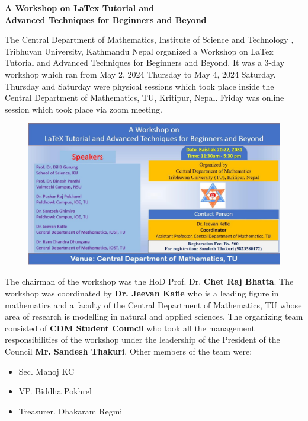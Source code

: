 \documentclass[a4paper,12pt]{report}
\begin{document}
\begin{center}
  \bfseries \Large A Workshop on LaTex Tutorial and\\
  Advanced Techniques for Beginners and Beyond

\end{center}
\vspace{5mm}
The Central Department of Mathematics, Institute of Science and Technology , Tribhuvan University, Kathmandu Nepal organized a Workshop on LaTex Tutorial and Advanced Techniques for Beginners and Beyond. It was a 3-day workshop which ran from May 2, 2024 Thursday to May 4, 2024 Saturday. Thursday and Saturday were physical sessions which took place inside the Central Department of Mathematics, TU, Kritipur, Nepal. Friday was online session which took place via zoom meeting.
\vspace{5mm}

\begin{figure}[h!]
  \centering
  \includegraphics[scale=0.33]{flyer.jpg}
\end{figure}
\vspace{5mm}

\noindent
The chairman of the workshop was the HoD Prof. Dr. \textbf{Chet Raj Bhatta}. The workshop was coordinated by \textbf{Dr. Jeevan Kafle} who is a leading figure in mathematics and a faculty of the Central Department of Mathematics, TU whose area of research is modelling in natural and applied sciences. The organizing team consisted of \textbf{CDM Student Council} who took all the management responsibilities of the workshop under the leadership of the President of the Council \textbf{Mr. Sandesh Thakuri}. Other members of the team were:
\begin{itemize}
\item Sec. Manoj KC
\item VP. Biddha Pokhrel
\item Treasurer. Dhakaram Regmi
\end{itemize}
\end{document}
